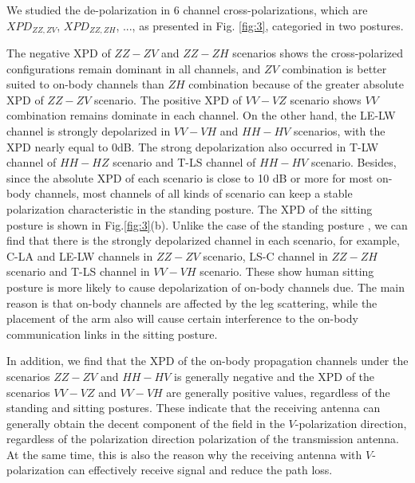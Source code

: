 \documentclass[conference]{IEEEtran}
\begin{document}
We studied the de-polarization in 6 channel cross-polarizations, which are $XPD_{ZZ,ZV}$, $XPD_{ZZ,ZH}$, ..., as presented in Fig. \ref{fig:3}, categoried in two postures.

The negative XPD of $ZZ-ZV$ and $ZZ-ZH$ scenarios shows the cross-polarized configurations remain dominant in all channels, and $ZV$ combination is better suited to on-body channels than $ZH$ combination because of the greater absolute XPD of $ZZ-ZV$ scenario. The positive XPD of $VV-VZ$ scenario shows $VV$ combination remains dominate in each channel. On the other hand, the LE-LW channel is strongly depolarized in $VV-VH$ and $HH-HV$ scenarios, with the XPD nearly equal to 0dB. The strong depolarization also occurred in T-LW channel of $HH-HZ$ scenario and T-LS channel of $HH-HV$ scenario. Besides, since the absolute XPD of each scenario is close to 10 dB or more for most on-body channels, most channels of all kinds of scenario can keep a stable polarization characteristic in the standing posture. The XPD of the sitting posture is shown in Fig.\ref{fig:3}(b). Unlike the case of  the standing posture , we can find that there is the strongly depolarized channel in each scenario, for example, C-LA and LE-LW channels in $ZZ-ZV$ scenario, LS-C channel in $ZZ-ZH$ scenario and T-LS channel in $VV-VH$ scenario. These show human sitting posture is more likely to cause depolarization of on-body channels due. The main reason is that on-body channels are affected by the leg scattering, while the placement of the arm also will cause certain interference to the on-body communication links in the sitting posture.

In addition, we find that the XPD of the on-body propagation channels under the scenarios $ZZ-ZV$ and $HH-HV$ is generally negative and the XPD of the scenarios $VV-VZ$ and $VV-VH$ are generally positive values, regardless of the standing and sitting postures. These indicate that the receiving antenna can generally obtain the decent component of the field in the $V$-polarization direction, regardless of the polarization direction polarization of the transmission antenna. At the same time, this is also the reason why the receiving antenna with $V$-polarization can effectively receive signal and reduce the path loss.
\end{document}
